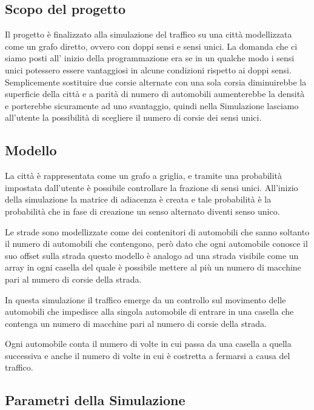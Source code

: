 \documentclass[main.tex]{subfiles}
\begin{document}
\subsection{Scopo del progetto}

Il progetto è finalizzato alla simulazione del traffico su una città modellizzata come un grafo diretto, ovvero con doppi sensi e sensi unici.
La domanda che ci siamo posti all' inizio della programmazione era se in un qualche modo i sensi unici potessero essere vantaggiosi in alcune condizioni
rispetto ai doppi sensi.
Semplicemente sostituire due corsie alternate con una sola corsia diminuirebbe la superficie della città
e a parità di numero di automobili aumenterebbe la densità e porterebbe sicuramente ad uno svantaggio, quindi nella Simulazione
lasciamo all'utente la possibilità di scegliere il numero di corsie dei sensi unici.

\subsection{Modello}

La città è rappresentata come un grafo a griglia, e tramite una probabilità impostata dall'utente è possibile controllare la frazione di sensi unici.
All'inizio della simulazione la matrice di adiacenza è creata e tale probabilità è la probabilità che in fase di creazione un senso alternato diventi senso unico.

Le strade sono modellizzate come dei contenitori di automobili che sanno soltanto il numero di automobili che contengono, però dato che ogni automobile conosce il suo offset sulla strada
questo modello è analogo ad una strada visibile come un array in ogni casella del quale è possibile mettere al più un numero di macchine pari al numero di corsie della strada.

In questa simulazione il traffico emerge da un controllo sul movimento delle automobili che impedisce
alla singola automobile di entrare in una casella che contenga un numero di macchine pari al numero di corsie della strada.

Ogni automobile conta il numero di volte in cui passa da una casella a quella successiva e anche il numero di volte in cui
è costretta a fermarsi a causa del traffico.

\subsection{Parametri della Simulazione }
\end{document}

